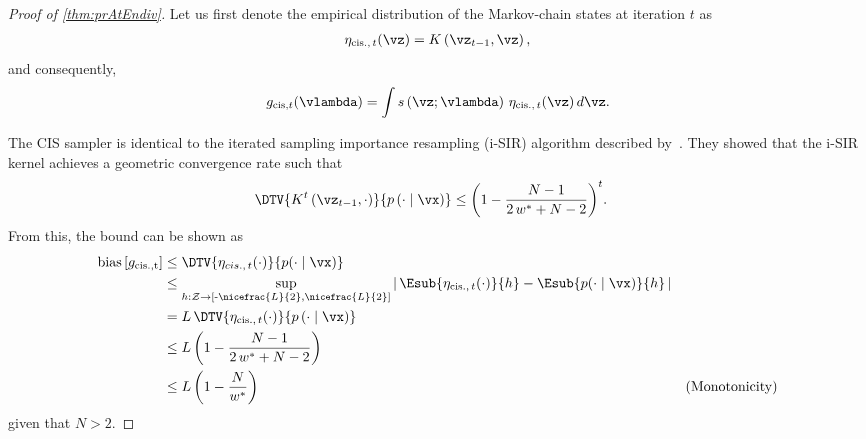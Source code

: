 \label{proofsection:prAtEndiv}\begin{proof}[Proof of \autoref{thm:prAtEndiv}]\label{proof:prAtEndiv}Let us first denote the empirical distribution of the Markov-chain states at iteration \(t\) as \begin {align} \eta _{\mathrm {cis.},\, t}(\vz ) = K\left (\vz _{t-1}, \vz \right ), \end {align} and consequently, \begin {align} g_{\mathrm {cis}, t}(\vlambda ) = \int s\left (\vz ; \vlambda \right ) \, \eta _{\mathrm {cis.},\, t}(\vz ) \, d\vz . \end {align} \par The CIS sampler is identical to the iterated sampling importance resampling (i-SIR) algorithm described by~\citet {andrieu_uniform_2018}. They showed that the i-SIR kernel achieves a geometric convergence rate such that \begin {align} \DTV {K^{t}\left (\vz _{t-1},\cdot \right )}{p\left (\cdot \mid \vx \right )} &\leq {\left (1 - \frac {N - 1}{2\,w^* + N - 2}\right )}^t. \end {align} From this, the bound can be shown as \begin {align} \mathrm {bias}\left [ g_{\mathrm {cis., t}} \right ] &\leq \DTV {\eta _{cis.,\, t}(\cdot )}{p(\cdot \mid \vx )} \\ &\leq \sup _{h : \mathcal {Z} \rightarrow \left [ \text {-}\nicefrac {L}{2}, \nicefrac {L}{2} \right ]} \left |\, \Esub {\eta _{\mathrm {cis.},\, t}(\cdot )}{h} - \Esub {p(\cdot \mid \vx )}{h} \,\right | \\ &= L \, \DTV { \eta _{\mathrm {cis.},\, t}(\cdot ) }{p\left (\cdot \mid \vx \right )} \\ &\leq L \, {\left (1 - \frac {N - 1}{2\,w^* + N - 2}\right )} \\ &\leq L \, {\left (1 - \frac {N}{w^*}\right )} &(\text {Monotonicity}) \end {align} given that \(N > 2\).\end{proof}
\prAtEndRestatev*

